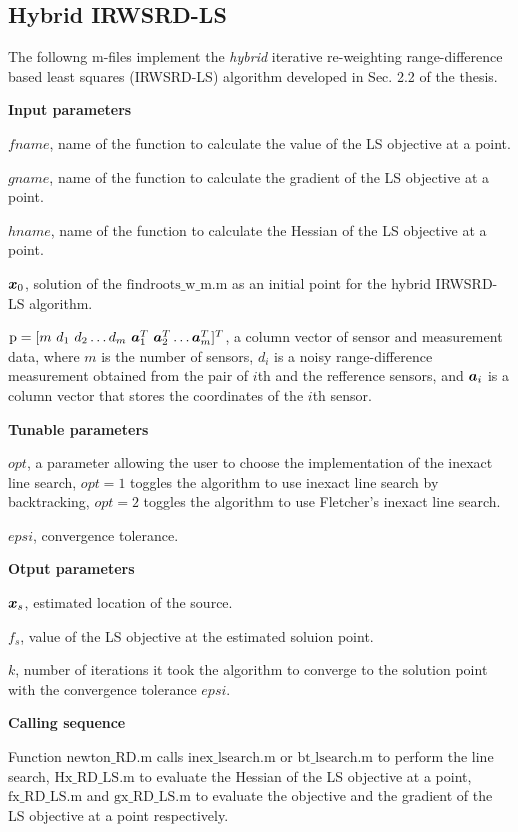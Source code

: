 \subsection{Hybrid IRWSRD-LS}

The followng m-files implement the \textit{hybrid} iterative re-weighting range-difference based least squares (IRWSRD-LS) algorithm developed in Sec. 2.2 of the thesis. 

\phantom{m}

\noindent
\textbf{Input parameters}

\noindent
$fname$, name of the function to calculate the value of the LS objective at a point.

\noindent
$gname$, name of the function to calculate the gradient of the LS objective at a point.

\noindent
$hname$, name of the function to calculate the Hessian of the LS objective at a point.


\noindent
$\mbox{\boldmath$x$}_0$, solution of the $\mbox{findroots\_w\_m.m}$ as an initial point for the hybrid IRWSRD-LS algorithm.


\noindent
$\mbox{p} = [m \ d_1 \ d_2 \ldots d_m \ \Ba_1^T \ \Ba_2^T \ldots \Ba_m^T]^T$, a column vector of sensor and measurement data, where $m$ is the number of sensors, $d_i$ is a noisy range-difference measurement obtained from the pair of $i$th and the refference sensors, and $\mbox{\boldmath$a$}_i$ is a column vector that stores the coordinates of the $i$th sensor.


\noindent
\textbf{Tunable parameters}

\noindent
$opt$, a parameter allowing the user to choose the implementation of the inexact line search, $opt = 1$ toggles the algorithm to use inexact line search by backtracking, $opt = 2$ toggles the algorithm to use Fletcher's inexact line search.

\noindent
$epsi$, convergence tolerance.

\noindent
\textbf{Otput parameters}

\noindent
$\mbox{\boldmath$x$}_s$, estimated location of the source.

\noindent
$f_s$, value of the LS objective at the estimated soluion point.

\noindent
$k$, number of iterations it took the algorithm to  converge to the solution point with the convergence tolerance $epsi$.

\noindent
\textbf{Calling sequence}

\noindent
Function $\mbox{newton\_RD.m}$ calls $\mbox{inex\_lsearch.m}$ or $\mbox{bt\_lsearch.m}$ to perform the line search, $\mbox{Hx\_RD\_LS.m}$ to evaluate the Hessian of the LS objective at a point, $\mbox{fx\_RD\_LS.m}$ and $\mbox{gx\_RD\_LS.m}$ to evaluate the objective and the gradient of the LS objective at a point respectively.  

